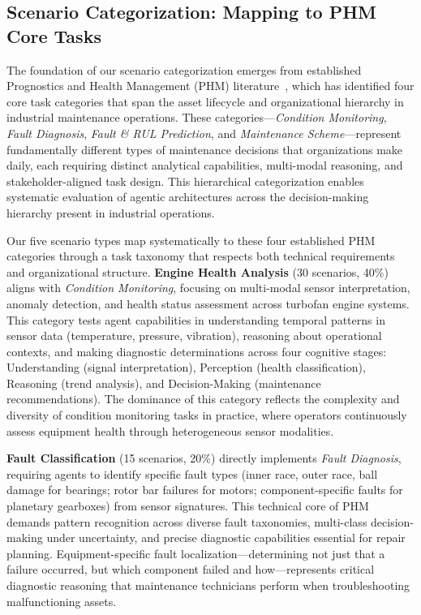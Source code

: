 \documentclass[sigconf]{acmart}
\begin{document}
\subsection{Scenario Categorization: Mapping to PHM Core Tasks}
\label{subsec:categorization}

The foundation of our scenario categorization emerges from established Prognostics and Health Management (PHM) literature~\cite{phmBench2024}, which has identified four core task categories that span the asset lifecycle and organizational hierarchy in industrial maintenance operations. These categories---\textit{Condition Monitoring}, \textit{Fault Diagnosis}, \textit{Fault \& RUL Prediction}, and \textit{Maintenance Scheme}---represent fundamentally different types of maintenance decisions that organizations make daily, each requiring distinct analytical capabilities, multi-modal reasoning, and stakeholder-aligned task design. This hierarchical categorization enables systematic evaluation of agentic architectures across the decision-making hierarchy present in industrial operations.

Our five scenario types map systematically to these four established PHM categories through a task taxonomy that respects both technical requirements and organizational structure. \textbf{Engine Health Analysis} (30 scenarios, 40\%) aligns with \textit{Condition Monitoring}, focusing on multi-modal sensor interpretation, anomaly detection, and health status assessment across turbofan engine systems. This category tests agent capabilities in understanding temporal patterns in sensor data (temperature, pressure, vibration), reasoning about operational contexts, and making diagnostic determinations across four cognitive stages: Understanding (signal interpretation), Perception (health classification), Reasoning (trend analysis), and Decision-Making (maintenance recommendations). The dominance of this category reflects the complexity and diversity of condition monitoring tasks in practice, where operators continuously assess equipment health through heterogeneous sensor modalities.

\textbf{Fault Classification} (15 scenarios, 20\%) directly implements \textit{Fault Diagnosis}, requiring agents to identify specific fault types (inner race, outer race, ball damage for bearings; rotor bar failures for motors; component-specific faults for planetary gearboxes) from sensor signatures. This technical core of PHM demands pattern recognition across diverse fault taxonomies, multi-class decision-making under uncertainty, and precise diagnostic capabilities essential for repair planning. Equipment-specific fault localization---determining not just that a failure occurred, but which component failed and how---represents critical diagnostic reasoning that maintenance technicians perform when troubleshooting malfunctioning assets.
\end{document}
